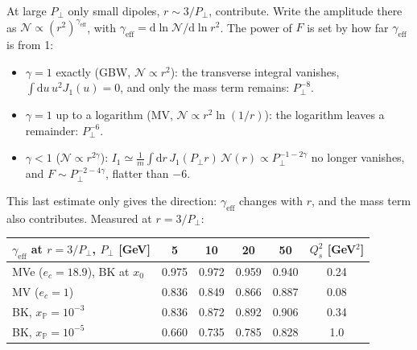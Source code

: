 \documentclass[12pt]{article}
\newcommand{\xpo}{x_{\mathbb{P}}}
\begin{document}
At large $P_\perp$ only small dipoles, $r\sim3/P_\perp$, contribute. Write the amplitude there as
$\mathcal N\propto(r^2)^{\gamma_{\mathrm{eff}}}$, with $\gamma_{\mathrm{eff}}=\mathrm{d}\ln\mathcal N/\mathrm{d}\ln r^2$. The power of $F$
is set by how far $\gamma_{\mathrm{eff}}$ is from 1:
\begin{itemize}
\item $\gamma=1$ exactly (GBW, $\mathcal N\propto r^2$): the transverse integral vanishes, $\int\mathrm{d}u\,u^2J_1(u)=0$,
  and only the mass term remains: $P_\perp^{-8}$.
\item $\gamma=1$ up to a logarithm (MV, $\mathcal N\propto r^2\ln(1/r)$): the logarithm leaves a remainder: $P_\perp^{-6}$.
\item $\gamma<1$ ($\mathcal N\propto r^{2\gamma}$): $I_1\simeq\frac1m\int\mathrm{d}r\,J_1(P_\perp r)\,\mathcal N(r)\propto P_\perp^{-1-2\gamma}$
  no longer vanishes, and $F\sim P_\perp^{-2-4\gamma}$, flatter than $-6$.
\end{itemize}
This last estimate only gives the direction: $\gamma_{\mathrm{eff}}$ changes with $r$, and the mass term also
contributes. Measured at $r=3/P_\perp$:
\begin{center}
\begin{tabular}{l|cccc|c}
\toprule
$\gamma_{\mathrm{eff}}$ at $r=3/P_\perp$, $P_\perp$ [GeV] & 5 & 10 & 20 & 50 & $Q_s^2$ [GeV$^2$] \\
\midrule
MVe ($e_c=18.9$), BK at $x_0$ & 0.975 & 0.972 & 0.959 & 0.940 & 0.24 \\
MV ($e_c=1$)                  & 0.836 & 0.849 & 0.866 & 0.887 & 0.08 \\
BK, $\xpo=10^{-3}$            & 0.836 & 0.872 & 0.892 & 0.906 & 0.34 \\
BK, $\xpo=10^{-5}$            & 0.660 & 0.735 & 0.785 & 0.828 & 1.0 \\
\bottomrule
\end{tabular}
\end{center}
\end{document}
